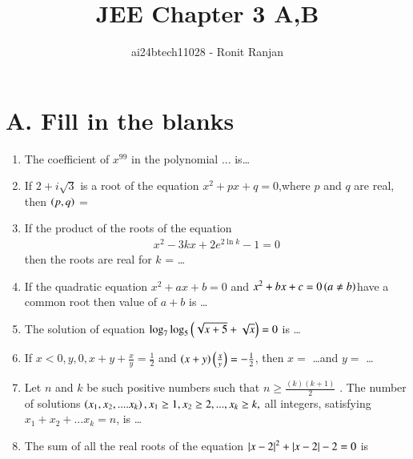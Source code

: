 \documentclass[journal,12pt,twocolumn]{IEEEtran}
\theoremstyle{remark}
\begin{document}

\vspace{3cm}

\title{JEE Chapter 3 A,B}
\author{ai24btech11028 - Ronit Ranjan}
\maketitle
\newpage
\bigskip
\section*{A. Fill in the blanks}
\begin{enumerate}
    \item The coefficient of $x^{99}$ in the polynomial ...
    is\dots \hfill {}
    
    \item If $2+i\sqrt{3}$ is a root of the equation $x^2 + px +q =0$,where $p$ and $q$ are real, then $\left(p,q\right)$ = \brak{\dots , \dots}\hfill {}
    
    \item If the product of the roots of the equation\\
    \begin{align}
        x^2 -3kx +2e^{2\ln{k}} -1=0
    \end{align}
    then the roots are real for $k$ = \dots\hfill {}
    
    \item If the quadratic equation $x^2 + ax +b=0$ and $x^2 + bx + c=0 \left(a \ne b\right)$have a common root then value of $a+b$ is \dots \hfill {}
    
    \item The solution of equation $\log_{7}\log_{5}\left(\sqrt{x+5}+\sqrt{x}\right)=0$ is \dots \hfill {}
    
    \item If $x<0, y,0, x + y + \frac{x}{y} = \frac{1}{2}$ and $\left(x+y\right)\left(\frac{x
    }{y}\right) = -\frac{1}{2}$, then $x=$ \dots and $y=$ \dots \hfill {}
    
    \item Let $n$ and $k$ be such positive numbers such that $n \geq \frac{(k)(k+1)}{2}$ . The number of solutions $\left(x_1,x_2,....x_k\right), x_1 \geq 1, x_2 \geq 2,...,x_k \geq k, $ all integers, satisfying $x_1+x_2+...x_k = n$, is \dots  \hfill {}
    \item The sum of all the real roots of the equation $\left\vert x-2\right\vert^2+\left\vert x-2\right\vert-2 = 0$ is \hfill {}
\end{enumerate}
\end{document}
